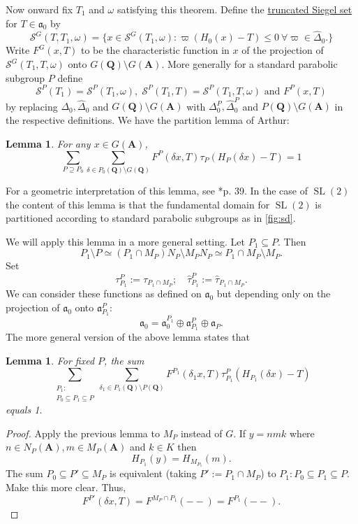 \documentclass[11pt]{amsart}
\def\A{\mathbf A}
\def\Q{\mathbf Q}
\def\SSS{\mathcal S}
\def\aaa{\mathfrak a}
\def\cb#1{{\color{black}#1}}
\def\bs{\setminus} 			%
\def\se{\subseteq}
\def\sl{\operatorname{SL}}
\newtheorem{lemma}[theorem]{Lemma}
\theoremstyle{remark}
\begin{document}
Now onward fix $T_1$ and $\omega$ satisfying this theorem. Define the \underline{truncated Siegel set} for $T \in \aaa_0$ by
\[ \SSS^G(T, T_1, \omega) = \{ x \in \SSS^G(T_1, \omega) : \varpi(H_0(x) - T) \leq 0 \ \forall \varpi \in \hat\Delta_0. \} \]
Write $F^G(x, T)$ to be the characteristic function in $x$ of the projection of $\SSS^G(T_1, T, \omega)$ onto $G(\Q)\bs G(\A)$. More generally for a standard parabolic subgroup $P$ define 
\[ \SSS^P(T_1) = \SSS^P(T_1, \omega), \; \SSS^P(T_1, T) = \SSS^P(T_1, T, \omega) \text{ and } F^P(x, T) \]
by replacing $\Delta_0, \hat\Delta_0$ and $G(\Q)\bs G(\A)$ with $\Delta_0^P, \hat \Delta_0^P$ and $P(\Q)\bs G(\A)$ in the respective definitions. We have the partition lemma of Arthur:
\begin{lemma}
	For any $x \in G(\A)$, 
	\[ \sum_{P \supseteq P_0} \sum_{\delta \in P_0(\Q) \bs G(\Q)} F^P(\delta x, T) \tau_P(H_P(\delta x) - T) = 1 \]
\end{lemma}
For a geometric interpretation of this lemma, see \cite{clay}*{p. 39}. \cb{In the case of $\sl(2)$ the content of this lemma is that the fundamental domain for $\sl(2)$ is partitioned according to standard parabolic subgroups as in \cref{fig:sd}. }

We will apply this lemma in a more general setting. Let $P_1 \se P$. Then
\[ P_1 \bs P \simeq (P_1 \cap M_P) N_P \bs M_P N_P \simeq P_1 \cap M_P \bs M_P. \]
Set
\[\tau_{P_1}^P := \tau_{P_1 \cap M_P}; \quad \hat\tau_{P_1}^P := \hat\tau_{P_1 \cap M_P}. \]
We can consider these functions as defined on $\aaa_0$ but depending only on the projection of $\aaa_0$ onto $\aaa_{P_1}^P$: 
\[ \aaa_0 = \aaa_0^{P_1} \oplus \aaa_{P_1}^P \oplus \aaa_P. \]
The more general version of the above lemma states that 
\begin{lemma}
	For fixed $P$, the sum
	\[ \sum_{\substack{P_1 : \\ P_0 \se P_1 \se P}} \sum_{\delta_1 \in P_1(\Q) \bs P(\Q)} 
			F^{P_1}(\delta_1 x, T) \tau_{P_1}^P (H_{P_1}(\delta x) - T) \]
	equals 1. 
\end{lemma}

\begin{proof}
	Apply the previous lemma to $M_P$ instead of $G$. If $y = nmk$ where $n \in N_P(\A), m \in M_P(\A)$ and $k \in K$ then
	\[ H_{P_1}(y) = H_{M_{P_1}}(m). \]
	The sum $P_0 \se P' \se M_P$ is equivalent (taking $P' := P_1 \cap M_P$) to $P_1 : P_0 \se P_1 \se P$. {\color{red} Make this more clear.} Thus, 
	\[ F^{P'}(\delta x, T) = F^{M_P \cap P_1} (--) = F^{P_1}(--). \]
\end{proof}
\end{document}
